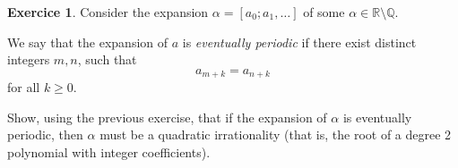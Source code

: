 \documentclass[12pt,a4paper]{article}
\theoremstyle{plain}
\newtheorem*{Sol*}{Solution}
\theoremstyle{definition}
\newtheorem{Ex}{Exercice}
\def \Q {\mathbb Q}
\def \R {\mathbb R}
\newif\ifsolutions
\newcommand{\exercise}[2]{
			\begin{Ex} #1 \end{Ex}
			\ifsolutions  \begin{Sol*} #2 \end{Sol*} \bigskip \else \bigskip  \fi
		}
\begin{document}
\exercise{
	Consider the expansion $\alpha = [a_0; a_1, \dots]$ of some $\alpha \in \R\setminus\Q$.

	We say that the expansion of $a$ is \emph{eventually periodic} if there exist distinct integers $m, n$, such that
		\[ a_{m+k} = a_{n+k} \]
	for all $k\geq0$.

	Show, using the previous exercise, that if the expansion of $\alpha$ is eventually periodic, then $\alpha$ must be a quadratic irrationality (that is, the root of a degree 2 polynomial with integer coefficients).
}
{
	In the notations of exercise 3, we have by assumption that $x_m = x_n$ for some distinct integers $m,n$.

	Exercise 3 implies that
		\[ \alpha = \frac{x_{m}p_{m-1} + p_{m-2}}{x_{m}q_{m-1} + q_{m-2}} =  \frac{x_{m}p_{n-1} + p_{n-2}}{x_{m}q_{n-1} + q_{n-2}}. \]
	 Manipulating the expression yields a degree two polynomial to which $x_m$ is solution.

	The number $\alpha$ belongs to the field $\Q(x_m)$ which has degree at most 2. In fact it cannot have degree 1, since $\alpha$ was assumed irrational.
	As such, $\alpha$ is a quadratic irrationality.

}


%	
%
\end{document}

